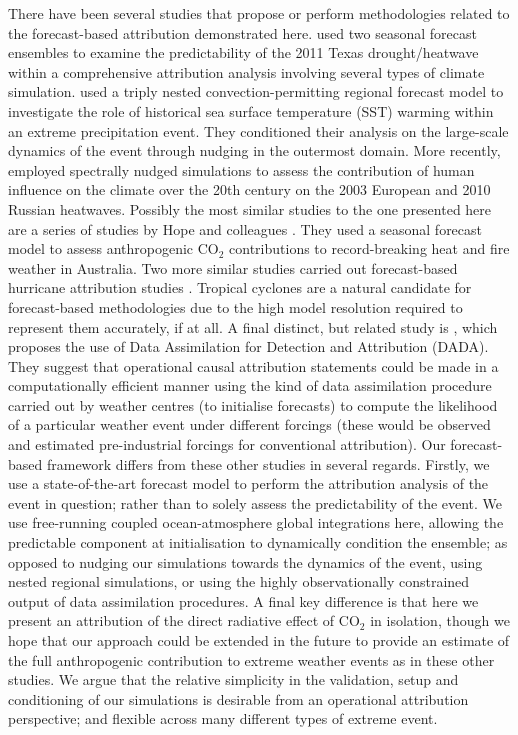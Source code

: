   There have been several studies that propose or perform methodologies related to the forecast-based attribution demonstrated here. \citet{hoerling_anatomy_2013} used two seasonal forecast ensembles to examine the predictability of the 2011 Texas drought/heatwave within a comprehensive attribution analysis involving several types of climate simulation. \citet{meredith_crucial_2015} used a triply nested convection-permitting regional forecast model to investigate the role of historical sea surface temperature (SST) warming within an extreme precipitation event. They conditioned their analysis on the large-scale dynamics of the event through nudging in the outermost domain. More recently, \citet{van_garderen_methodology_2021} employed spectrally nudged simulations to assess the contribution of human influence on the climate over the 20th century on the 2003 European and 2010 Russian heatwaves. Possibly the most similar studies to the one presented here are a series of studies by Hope and colleagues \citep{hope_contributors_2015,hope_what_2016,hope_determining_2019}. They used a seasonal forecast model to assess anthropogenic CO$_2$ contributions to record-breaking heat and fire weather in Australia. Two more similar studies carried out forecast-based hurricane attribution studies \citep{reed_forecasted_2020,lackmann_hurricane_2015}. Tropical cyclones are a natural candidate for forecast-based methodologies due to the high model resolution required to represent them accurately, if at all. A final distinct, but related study is \citet{hannart_dada_2016}, which proposes the use of Data Assimilation for Detection and Attribution (DADA). They suggest that operational causal attribution statements could be made in a computationally efficient manner using the kind of data assimilation procedure carried out by weather centres (to initialise forecasts) to compute the likelihood of a particular weather event under different forcings (these would be observed and estimated pre-industrial forcings for conventional attribution). Our forecast-based framework differs from these other studies in several regards. Firstly, we use a state-of-the-art forecast model to perform the attribution analysis of the event in question; rather than to solely assess the predictability of the event. We use free-running coupled ocean-atmosphere global integrations here, allowing the predictable component at initialisation to dynamically condition the ensemble; as opposed to nudging our simulations towards the dynamics of the event, using nested regional simulations, or using the highly observationally constrained output of data assimilation procedures. A final key difference is that here we present an attribution of the direct radiative effect of CO$_2$ in isolation, though we hope that our approach could be extended in the future to provide an estimate of the full anthropogenic contribution to extreme weather events as in these other studies. We argue that the relative simplicity in the validation, setup and conditioning of our simulations is desirable from an operational attribution perspective; and flexible across many different types of extreme event. 


